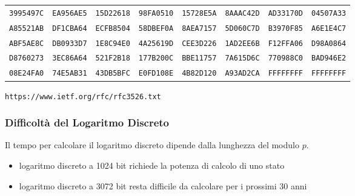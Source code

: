 \documentclass[]{beamer}
\begin{document}
\begin{frame}
\begin{tabular}{rrrrrrrr}
{\tiny \color{olive}\tt 3995497C} & {\tiny \color{olive}\tt EA956AE5} & {\tiny \color{olive}\tt 15D22618} & {\tiny \color{olive}\tt 98FA0510} & {\tiny \color{olive}\tt 15728E5A} & {\tiny \color{olive}\tt 8AAAC42D} & {\tiny \color{olive}\tt AD33170D} & {\tiny \color{olive}\tt 04507A33} \\
{\tiny \color{olive}\tt A85521AB} & {\tiny \color{olive}\tt DF1CBA64} & {\tiny \color{olive}\tt ECFB8504} & {\tiny \color{olive}\tt 58DBEF0A} & {\tiny \color{olive}\tt 8AEA7157} & {\tiny \color{olive}\tt 5D060C7D} & {\tiny \color{olive}\tt B3970F85} & {\tiny \color{olive}\tt A6E1E4C7} \\
{\tiny \color{olive}\tt ABF5AE8C} & {\tiny \color{olive}\tt DB0933D7} & {\tiny \color{olive}\tt 1E8C94E0} & {\tiny \color{olive}\tt 4A25619D} & {\tiny \color{olive}\tt CEE3D226} & {\tiny \color{olive}\tt 1AD2EE6B} & {\tiny \color{olive}\tt F12FFA06} & {\tiny \color{olive}\tt D98A0864} \\
{\tiny \color{olive}\tt D8760273} & {\tiny \color{olive}\tt 3EC86A64} & {\tiny \color{olive}\tt 521F2B18} & {\tiny \color{olive}\tt 177B200C} & {\tiny \color{olive}\tt BBE11757} & {\tiny \color{olive}\tt 7A615D6C} & {\tiny \color{olive}\tt 770988C0} & {\tiny \color{olive}\tt BAD946E2} \\
{\tiny \color{olive}\tt 08E24FA0} & {\tiny \color{olive}\tt 74E5AB31} & {\tiny \color{olive}\tt 43DB5BFC} & {\tiny \color{olive}\tt E0FD108E} & {\tiny \color{olive}\tt 4B82D120} & {\tiny \color{olive}\tt A93AD2CA} & {\tiny \color{olive}\tt FFFFFFFF} & {\tiny \color{olive}\tt FFFFFFFF} \\                     
\end{tabular}



\vfill

{\color{brown} \tt https://www.ietf.org/rfc/rfc3526.txt}

\end{frame}

\begin{frame}
\frametitle{Difficolt\`a del Logaritmo Discreto}

Il tempo per calcolare il logaritmo discreto dipende dalla lunghezza del modulo $p$.

\begin{itemize}
\item logaritmo discreto a 1024 bit richiede la potenza di calcolo di uno stato
\item logaritmo discreto a 3072 bit resta difficile da calcolare per i prossimi 30 anni
\end{itemize}

\end{frame}
\end{document}
